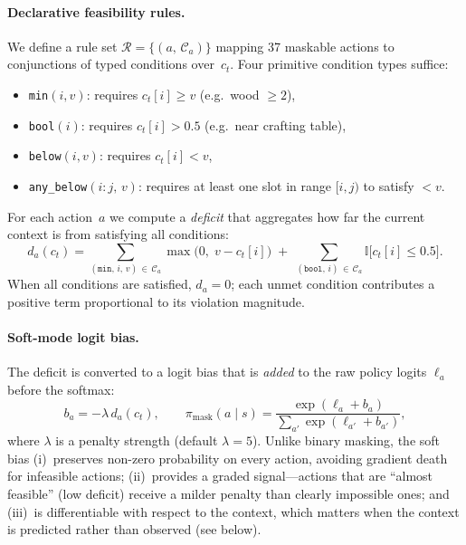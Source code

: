 \documentclass{article}
\begin{document}
\paragraph{Declarative feasibility rules.}
We define a rule set $\mathcal{R}=\{(a,\,\mathcal{C}_a)\}$ mapping
37 maskable actions to conjunctions of typed conditions over~$c_t$.
Four primitive condition types suffice:
\begin{itemize}
  \item \texttt{min}$(i,v)$: requires $c_t[i]\!\ge\!v$\;
        (e.g.\ wood $\ge 2$),
  \item \texttt{bool}$(i)$: requires $c_t[i]\!>\!0.5$\;
        (e.g.\ near crafting table),
  \item \texttt{below}$(i,v)$: requires $c_t[i]\!<\!v$,
  \item \texttt{any\_below}$(i{:}j,\,v)$: requires at least one slot
        in range $[i,j)$ to satisfy $<v$.
\end{itemize}
For each action~$a$ we compute a \emph{deficit} that aggregates how
far the current context is from satisfying all conditions:
\begin{equation}
  d_a(c_t)
  =
  \sum_{(\texttt{min},\,i,\,v)\,\in\,\mathcal{C}_a}
    \max\!\bigl(0,\; v - c_t[i]\bigr)
  \;+\;
  \sum_{(\texttt{bool},\,i)\,\in\,\mathcal{C}_a}
    \mathbb{I}\!\bigl[c_t[i]\le 0.5\bigr].
  \label{eq:deficit}
\end{equation}
When all conditions are satisfied, $d_a\!=\!0$; each unmet condition
contributes a positive term proportional to its violation magnitude.

\paragraph{Soft-mode logit bias.}
The deficit is converted to a logit bias that is \emph{added} to the
raw policy logits $\ell_a$ before the softmax:
\begin{equation}
  b_a
  =
  -\lambda\,d_a(c_t),
  \qquad
  \pi_{\mathrm{mask}}(a\mid s)
  =
  \frac{\exp(\ell_a + b_a)}
       {\sum_{a'}\exp(\ell_{a'} + b_{a'})},
  \label{eq:softmask}
\end{equation}
where $\lambda$ is a penalty strength (default $\lambda\!=\!5$).
Unlike binary masking, the soft bias (i)~preserves non-zero
probability on every action, avoiding gradient death for infeasible
actions; (ii)~provides a graded signal---actions that are ``almost
feasible'' (low deficit) receive a milder penalty than clearly
impossible ones; and (iii)~is differentiable with respect to the
context, which matters when the context is predicted rather than
observed (see below).
\end{document}
